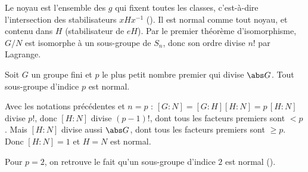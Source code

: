 \begin{preuve}
Le noyau est l'ensemble des $g$ qui fixent toutes les classes, c'est-à-dire l'intersection des stabilisateurs $xHx^{-1}$ (). Il est normal comme tout noyau, et contenu dans $H$ (stabilisateur de $eH$). Par le premier théorème d'isomorphisme, $G/N$ est isomorphe à un sous-groupe de $S_n$, donc son ordre divise $n!$ par Lagrange.
\end{preuve}
\begin{corollaire}\label{cor-plus-petit-premier}
Soit $G$ un groupe fini et $p$ le plus petit nombre premier qui divise $\abs G$. Tout sous-groupe d'indice $p$ est normal.
\end{corollaire}
\begin{preuve}
Avec les notations précédentes et $n=p$ : $[G:N]=[G:H][H:N]=p\,[H:N]$ divise $p!$, donc $[H:N]$ divise $(p-1)!$, dont tous les facteurs premiers sont $<p$. Mais $[H:N]$ divise aussi $\abs G$, dont tous les facteurs premiers sont $\ge p$. Donc $[H:N]=1$ et $H=N$ est normal.
\end{preuve}
\begin{remarque}
Pour $p=2$, on retrouve le fait qu'un sous-groupe d'indice $2$ est normal ().
\end{remarque}

